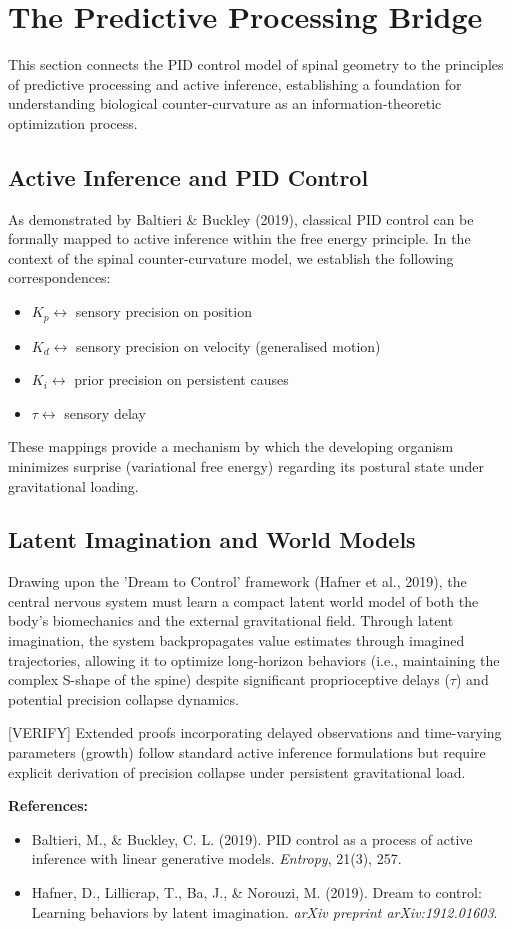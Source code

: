 \section{The Predictive Processing Bridge}

This section connects the PID control model of spinal geometry to the principles of predictive processing and active inference, establishing a foundation for understanding biological counter-curvature as an information-theoretic optimization process.

\subsection{Active Inference and PID Control}
As demonstrated by Baltieri \& Buckley (2019), classical PID control can be formally mapped to active inference within the free energy principle. In the context of the spinal counter-curvature model, we establish the following correspondences:
\begin{itemize}
    \item $K_p \leftrightarrow$ sensory precision on position
    \item $K_d \leftrightarrow$ sensory precision on velocity (generalised motion)
    \item $K_i \leftrightarrow$ prior precision on persistent causes
    \item $\tau \leftrightarrow$ sensory delay
\end{itemize}

These mappings provide a mechanism by which the developing organism minimizes surprise (variational free energy) regarding its postural state under gravitational loading.

\subsection{Latent Imagination and World Models}
Drawing upon the 'Dream to Control' framework (Hafner et al., 2019), the central nervous system must learn a compact latent world model of both the body's biomechanics and the external gravitational field. Through latent imagination, the system backpropagates value estimates through imagined trajectories, allowing it to optimize long-horizon behaviors (i.e., maintaining the complex S-shape of the spine) despite significant proprioceptive delays ($\tau$) and potential precision collapse dynamics.

[VERIFY] Extended proofs incorporating delayed observations and time-varying parameters (growth) follow standard active inference formulations but require explicit derivation of precision collapse under persistent gravitational load.

\vspace{1em}
\noindent \textbf{References:}
\begin{itemize}
    \item Baltieri, M., \& Buckley, C. L. (2019). PID control as a process of active inference with linear generative models. \textit{Entropy}, 21(3), 257.
    \item Hafner, D., Lillicrap, T., Ba, J., \& Norouzi, M. (2019). Dream to control: Learning behaviors by latent imagination. \textit{arXiv preprint arXiv:1912.01603}.
\end{itemize}
